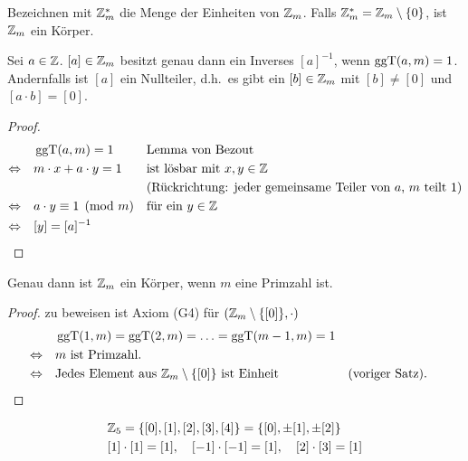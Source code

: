 \begin{definition}
Bezeichnen mit $\mathbb{Z}_{m}^*$ die Menge der Einheiten von $\mathbb{Z}_{m}$. Falls $\mathbb{Z}_{m}^* = \mathbb{Z}_{m} \setminus \{0\}$, ist $\mathbb{Z}_{m}$ ein Körper.
\end{definition}

\begin{satz}
Sei $a \in \mathbb{Z}$. $[a] \in \mathbb{Z}_{m}$ besitzt genau dann ein Inverses $[a]^{-1}$, wenn $\operatorname{ggT}(a, m) = 1$.\\
Andernfalls ist $[a]$ ein Nullteiler, d.h.\ es gibt ein $[b] \in \mathbb{Z}_{m}$ mit $[b] \neq [0]$ und $[a \cdot b] = [0]$.
\end{satz}

\begin{proof}
\begin{align*}
&\operatorname{ggT}(a, m) = 1 && \text{Lemma von Bezout} \\
\Leftrightarrow\quad &m \cdot x + a \cdot y = 1 && \text{ist lösbar mit } x, y \in \mathbb{Z} \\
& && \text{(Rückrichtung: jeder gemeinsame Teiler von $a$, $m$ teilt $1$)} \\
\Leftrightarrow\quad &a \cdot y \equiv 1 \pmod{m} && \text{für ein } y \in \mathbb{Z} \\
\Leftrightarrow\quad &[y] = [a]^{-1} && \qedhere
\end{align*}
\end{proof}

\begin{satz}
Genau dann ist $\mathbb{Z}_{m}$ ein Körper, wenn $m$ eine Primzahl ist.
\end{satz}

\begin{proof}
zu beweisen ist Axiom (G4) für $(\mathbb{Z}_{m} \setminus \{[0]\}, \cdot)$
\begin{align*}
&\operatorname{ggT}(1, m) = \operatorname{ggT}(2, m) = \ldots = \operatorname{ggT}(m-1, m) = 1 \\
\Leftrightarrow\quad &m \text{ ist Primzahl.} \\
\Leftrightarrow\quad &\text{Jedes Element aus } \mathbb{Z}_{m} \setminus \{[0]\} \text{ ist Einheit} && \text{(voriger Satz).} \qedhere
\end{align*}
\end{proof}

\begin{beispiel}
\begin{align*}
&\mathbb{Z}_{5} = \{[0], [1], [2], [3], [4]\} = \{[0], \pm[1], \pm[2]\} \\
&[1] \cdot [1] = [1], \quad [-1] \cdot [-1] = [1], \quad [2] \cdot [3] = [1]
\end{align*}
\end{beispiel}

